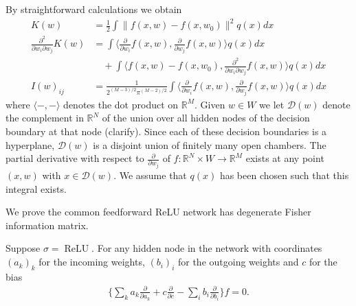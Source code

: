 \documentclass{article} %
\def\lto{\longrightarrow}
\begin{document}
By straightforward calculations we obtain
\begin{align}
K(w) &= \tfrac{1}{2} \int \| f(x,w) - f(x,w_0) \|^2 q(x) dx\\
\tfrac{\partial^2}{\partial w_i \partial w_j} K(w) &= \int \Big\langle \tfrac{\partial}{\partial w_i} f(x,w), \tfrac{\partial}{\partial w_j} f(x,w) \Big\rangle q(x) dx \nonumber \\
&\quad + \int \Big\langle f(x,w) - f(x,w_0), \tfrac{\partial^2}{\partial w_i \partial w_j} f(x,w) \Big\rangle q(x) dx \label{eq:Hessian}\\
I(w)_{ij} &= \frac{1}{2^{(M-3)/2} \pi^{(M-2)/2}} \int \Big\langle \tfrac{\partial}{\partial w_i} f(x,w), \tfrac{\partial}{\partial w_j} f(x,w) \Big\rangle q(x) dx\label{eq:fisher_relu}
\end{align}
where $\langle -, - \rangle$ denotes the dot product on $\mathbb{R}^M$. Given $w \in W$ we let $\mathcal{D}(w)$ denote the complement in $\mathbb{R}^N$ of the union over all hidden nodes of the decision boundary at that node (clarify). Since each of these decision boundaries is a hyperplane, $\mathcal{D}(w)$ is a disjoint union of finitely many open chambers. The partial derivative with respect to $\frac{\partial}{\partial w_j}$ of $f: \mathbb{R}^N \times W \lto \mathbb{R}^M$ exists at any point $(x,w)$ with $x \in \mathcal{D}(w)$. We assume that $q(x)$ has been chosen such that this integral exists.

We prove the common feedforward ReLU network has degenerate Fisher information matrix. 

\begin{lemma}\label{lemma:reln} Suppose $\sigma = \operatorname{ReLU}$. For any hidden node in the network with coordinates $(a_k)_k$ for the incoming weights, $(b_i)_i$ for the outgoing weights and $c$ for the bias
	\begin{align*}
	\Big\{ \sum_k a_{k}\frac{\partial}{\partial a_k} + c \frac{\partial}{\partial c}-\sum_{i} b_i\frac{\partial}{\partial b_i} \Big\} f = 0.
	\end{align*}
\end{lemma}
\end{document}
